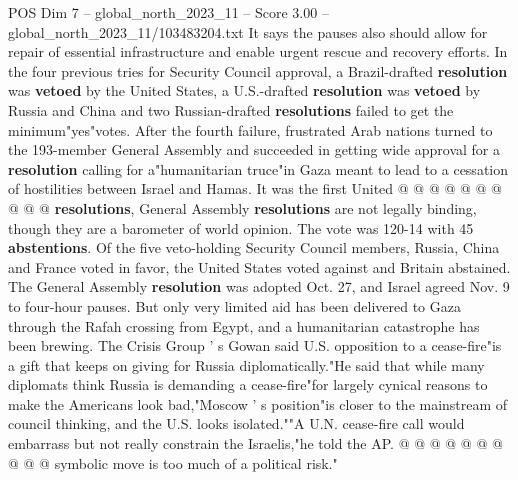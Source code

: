 \begin{textsample}{POS Dim 7 – global\_north\_2023\_11 – Score 3.00 – global\_north\_2023\_11/103483204.txt}
It says the pauses also should allow for repair of essential infrastructure and enable urgent rescue and recovery efforts.
In the four previous tries for Security Council approval, a Brazil-drafted \textbf{resolution} was \textbf{vetoed} by the United States, a U.S.-drafted \textbf{resolution} was \textbf{vetoed} by Russia and China and two Russian-drafted \textbf{resolutions} failed to get the minimum"yes"votes.
After the fourth failure, frustrated Arab nations turned to the 193-member General Assembly and succeeded in getting wide approval for a \textbf{resolution} calling for a"humanitarian truce"in Gaza meant to lead to a cessation of hostilities between Israel and Hamas.
It was the first United @ @ @ @ @ @ @ @ @ @ \textbf{resolutions}, General Assembly \textbf{resolutions} are not legally binding, though they are a barometer of world opinion.
The vote was 120-14 with 45 \textbf{abstentions}.
Of the five veto-holding Security Council members, Russia, China and France voted in favor, the United States voted against and Britain abstained.
The General Assembly \textbf{resolution} was adopted Oct. 27, and Israel agreed Nov. 9 to four-hour pauses.
But only very limited aid has been delivered to Gaza through the Rafah crossing from Egypt, and a humanitarian catastrophe has been brewing.
The Crisis Group ' s Gowan said U.S. opposition to a cease-fire"is a gift that keeps on giving for Russia diplomatically."He said that while many diplomats think Russia is demanding a cease-fire"for largely cynical reasons to make the Americans look bad,"Moscow ' s position"is closer to the mainstream of council thinking, and the U.S. looks isolated.""A U.N. cease-fire call would embarrass but not really constrain the Israelis,"he told the AP. @ @ @ @ @ @ @ @ @ @ symbolic move is too much of a political risk."

\end{textsample}
